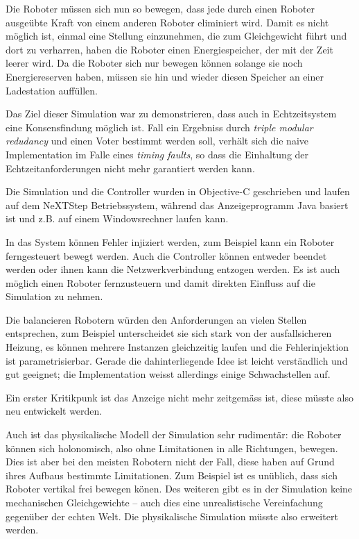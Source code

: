 Die Roboter m{\"{u}}ssen sich nun so bewegen, dass jede durch einen Roboter ausge{\"{u}}bte Kraft von einem
anderen Roboter eliminiert wird. Damit es nicht m{\"{o}}glich ist, einmal eine Stellung einzunehmen,
die zum Gleichgewicht f{\"{u}}hrt und dort zu verharren, haben die Roboter einen Energiespeicher, der
mit der Zeit leerer wird. Da die Roboter sich nur bewegen k{\"{o}}nnen solange sie noch Energiereserven haben, 
m{\"{u}}ssen sie hin und wieder diesen Speicher an einer Ladestation auff{\"{u}}llen.

Das Ziel dieser Simulation war zu demonstrieren, dass auch in Echtzeitsystem eine Konsensfindung m{\"{o}}glich
ist. Fall ein Ergebniss durch \textit{triple modular redudancy} und einen Voter bestimmt werden soll, 
verh{\"{a}}lt sich die naive Implementation im Falle eines \textit{timing faults}, so dass die
Einhaltung der Echtzeitanforderungen nicht mehr garantiert werden kann. 

Die Simulation und die Controller wurden in Objective-C geschrieben und laufen auf dem NeXTStep Betriebssystem, 
w{\"{a}}hrend das Anzeigeprogramm Java basiert ist und z.B. auf einem Windowsrechner laufen kann. 

In das System k{\"{o}}nnen Fehler injiziert werden, zum Beispiel kann ein Roboter ferngesteuert bewegt werden. Auch
die Controller k{\"{o}}nnen entweder beendet werden oder ihnen kann die Netzwerkverbindung entzogen werden. Es ist
auch m{\"{o}}glich einen Roboter fernzusteuern und damit direkten Einfluss auf die Simulation zu nehmen.

Die balancieren Robotern w{\"{u}}rden den Anforderungen an vielen Stellen entsprechen, zum Beispiel
unterscheidet sie sich stark von der ausfallsicheren Heizung, es k{\"{o}}nnen mehrere Instanzen
gleichzeitig laufen und die Fehlerinjektion ist parametrisierbar. Gerade die dahinterliegende Idee ist
leicht verst{\"{a}}ndlich und gut geeignet; die Implementation weisst allerdings einige Schwachstellen auf.

Ein erster Kritikpunk ist das Anzeige nicht mehr zeitgem{\"{a}}ss ist, diese m{\"{u}}sste also neu entwickelt werden.

Auch ist das physikalische Modell der Simulation sehr rudiment{\"{a}}r: die Roboter k{\"{o}}nnen sich
holonomisch, also ohne Limitationen in alle Richtungen, bewegen. Dies ist aber bei den meisten Robotern
nicht der Fall, diese haben auf Grund ihres Aufbaus bestimmte Limitationen. Zum Beispiel ist es un{\"{u}}blich, 
dass sich Roboter vertikal frei bewegen k{\"{o}}nen. Des weiteren gibt es in der Simulation keine mechanischen 
Gleichgewichte -- auch dies eine unrealistische Vereinfachung gegen{\"{u}}ber der echten Welt. Die
physikalische Simulation m{\"{u}}sste also erweitert werden.

